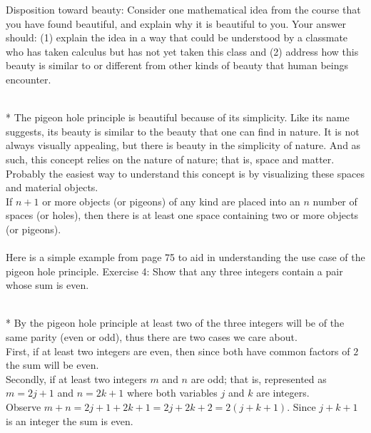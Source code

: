\documentclass[10pt]{article}
\makeatletter
\newenvironment{answer}[2][Answer]{\begin{trivlist}
\item[\hskip \labelsep {\bfseries #1}\hskip \labelsep {\bfseries #2.}]}{\end{trivlist}}
\newenvironment{question}[2][Question]{\begin{trivlist}
\item[\hskip \labelsep {\bfseries #1}\hskip \labelsep {\bfseries #2.}]}{\end{trivlist}}
\renewenvironment{proof}[1][\proofname]{\par
\pushQED{\qed}
\normalfont \topsep6\p@\@plus6\p@\relax
\trivlist
\item[\hskip\labelsep\itshape#1\@addpunct{.}]\mbox{}\\*}{\popQED\endtrivlist\@endpefalse}
\renewenvironment{answer}[1][Answer]{\par
\normalfont \topsep6\p@\@plus6\p@\relax
\trivlist
\item[\hskip\labelsep\itshape#1\@addpunct{.}]\mbox{}\\*}{\popQED\endtrivlist\@endpefalse}
\makeatother
\begin{document}
\newpage

\begin{question}{9}
Disposition toward beauty: Consider one mathematical idea from the course that you have found beautiful, and explain why it is beautiful to you. Your answer should: (1) explain the idea in a way that could be understood by a classmate who has taken calculus but has not yet taken this class and (2) address how this beauty is similar to or different from other kinds of beauty that human beings encounter.
\begin{answer}
	The pigeon hole principle is beautiful because of its simplicity. Like its name suggests, its beauty is similar to the beauty that one can find in nature. It is not always visually appealing, but there is beauty in the simplicity of nature. And as such, this concept relies on the nature of nature; that is, space and matter. Probably the easiest way to understand this concept is by visualizing these spaces and material objects. \\ \indent 
	If $n + 1$ or more objects (or pigeons) of any kind are placed into an $n$ number of spaces (or holes), then there is at least one space containing two or more objects (or pigeons). \\ \space \\ 
	Here is a simple example from page 75 to aid in understanding the use case of the pigeon hole principle. Exercise 4: Show that any three integers contain a pair whose sum is even.
	    \begin{proof}
	        By the pigeon hole principle at least two of the three integers will be of the same parity (even or odd), thus there are two cases we care about. \\ \indent First, if at least two integers are even, then since both have common factors of $2$ the sum will be even. \\ \indent Secondly, if at least two integers $m$ and $n$ are odd; that is, represented as $m = 2j + 1$ and $n = 2k + 1$ where both variables $j$ and $k$ are integers. \\ Observe $m + n = 2j + 1 + 2k + 1= 2j + 2k +2 = 2(j+k+1)$. Since $j+k+1$ is an integer the sum is even.
		\end{proof}
\end{answer}
\end{question}

\vspace{5mm}
\end{document}
